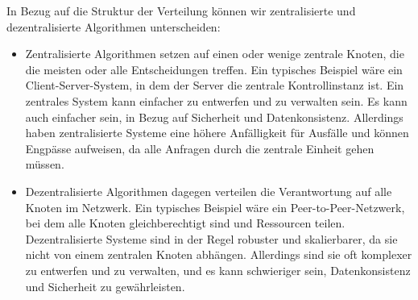 In Bezug auf die Struktur der Verteilung können wir zentralisierte und dezentralisierte Algorithmen unterscheiden:

\begin{itemize}
\item Zentralisierte Algorithmen setzen auf einen oder wenige zentrale Knoten, die die meisten oder alle Entscheidungen treffen. Ein typisches Beispiel wäre ein Client-Server-System, in dem der Server die zentrale Kontrollinstanz ist. Ein zentrales System kann einfacher zu entwerfen und zu verwalten sein. Es kann auch einfacher sein, in Bezug auf Sicherheit und Datenkonsistenz. Allerdings haben zentralisierte Systeme eine höhere Anfälligkeit für Ausfälle und können Engpässe aufweisen, da alle Anfragen durch die zentrale Einheit gehen müssen.

\item Dezentralisierte Algorithmen dagegen verteilen die Verantwortung auf alle Knoten im Netzwerk. Ein typisches Beispiel wäre ein Peer-to-Peer-Netzwerk, bei dem alle Knoten gleichberechtigt sind und Ressourcen teilen. Dezentralisierte Systeme sind in der Regel robuster und skalierbarer, da sie nicht von einem zentralen Knoten abhängen. Allerdings sind sie oft komplexer zu entwerfen und zu verwalten, und es kann schwieriger sein, Datenkonsistenz und Sicherheit zu gewährleisten.
\end{itemize}

